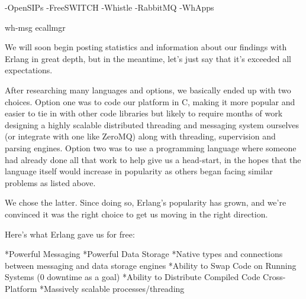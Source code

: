 -OpenSIPs
-FreeSWITCH
-Whistle
-RabbitMQ
-WhApps

wh-msg
ecallmgr

We will soon begin posting statistics and information about our findings with Erlang in great depth, but in the meantime, let’s just say that it’s exceeded all expectations.  

After researching many languages and options, we basically ended up with two choices. Option one was to code our platform in C, making it more popular and easier to tie in with other code libraries but likely to require months of work designing a highly scalable distributed threading and messaging system ourselves (or integrate with one like ZeroMQ) along with threading, supervision and parsing engines. Option two was to use a programming language where someone had already done all that work to help give us a head-start, in the hopes that the language itself would increase in popularity as others began facing similar problems as listed above.

We chose the latter. Since doing so, Erlang’s popularity has grown, and we’re convinced it was the right choice to get us moving in the right direction. 

Here’s what Erlang gave us for free:

*Powerful Messaging
*Powerful Data Storage
*Native types and connections between messaging and data storage engines
*Ability to Swap Code on Running Systems (0 downtime as a goal)
*Ability to Distribute Compiled Code Cross-Platform
*Massively scalable processes/threading

